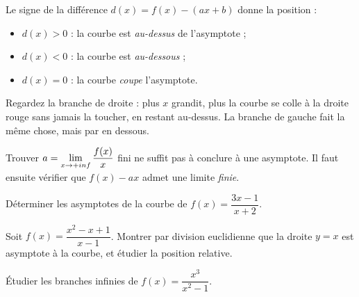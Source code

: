 \begin{propriete}
Le signe de la différence $d(x) = f(x)-(ax+b)$ donne la position :
\begin{itemize}[leftmargin=1.4em, itemsep=0.15em]
  \item $d(x) > 0$ : la courbe est \emph{au-dessus} de l'asymptote ;
  \item $d(x) < 0$ : la courbe est \emph{au-dessous} ;
  \item $d(x) = 0$ : la courbe \emph{coupe} l'asymptote.
\end{itemize}
\end{propriete}

\begin{visualisation}
\begin{center}
\end{center}

Regardez la branche de droite : plus $x$ grandit, plus la courbe se colle à la
droite rouge sans jamais la toucher, en restant au-dessus. La branche de
gauche fait la même chose, mais par en dessous.
\end{visualisation}

\begin{erreurclassique}
Trouver $a = \limpinf \dfrac{f(x)}{x}$ fini ne suffit pas à conclure à une
asymptote. Il faut ensuite vérifier que $f(x)-ax$ admet une limite
\emph{finie}.
\end{erreurclassique}

\begin{entrainement}
\exo[\niveau{1}] Déterminer les asymptotes de la courbe de
$f(x) = \dfrac{3x-1}{x+2}$.

\exo[\niveau{2}] Soit $f(x) = \dfrac{x^{2}-x+1}{x-1}$. Montrer par division
euclidienne que la droite $y = x$ est asymptote à la courbe, et étudier la
position relative.

\exo[\niveau{2}] Étudier les branches infinies de $f(x) = \dfrac{x^{3}}{x^{2}-1}$.
\end{entrainement}

